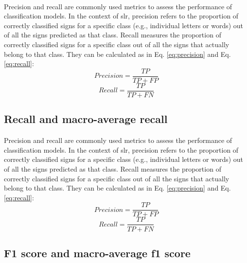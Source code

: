 \paragraph{}
Precision and recall are commonly used metrics to assess the performance of classification models. In the context of \ac{slr}, precision refers to the proportion of correctly classified signs for a specific class (e.g., individual letters or words) out of all the signs predicted as that class. Recall measures the proportion of correctly classified signs for a specific class out of all the signs that actually belong to that class. They can be calculated as in Eq. \ref{eq:precision} and Eq. \ref{eq:recall}:
\begin{equation}
	Precision = \frac{TP}{TP + FP} \label{eq:precision}
\end{equation}
\begin{equation}
	Recall = \frac{TP}{TP + FN} \label{eq:precision-macro}
\end{equation}
\subsection{Recall and macro-average recall}
\paragraph{}
Precision and recall are commonly used metrics to assess the performance of classification models. In the context of \ac{slr}, precision refers to the proportion of correctly classified signs for a specific class (e.g., individual letters or words) out of all the signs predicted as that class. Recall measures the proportion of correctly classified signs for a specific class out of all the signs that actually belong to that class. They can be calculated as in Eq. \ref{eq:precision} and Eq. \ref{eq:recall}:
\begin{equation}
	Precision = \frac{TP}{TP + FP} \label{eq:recall}
\end{equation}
\begin{equation}
	Recall = \frac{TP}{TP + FN} \label{eq:recall-macro}
\end{equation}
\subsection{F1 score and macro-average f1 score}
